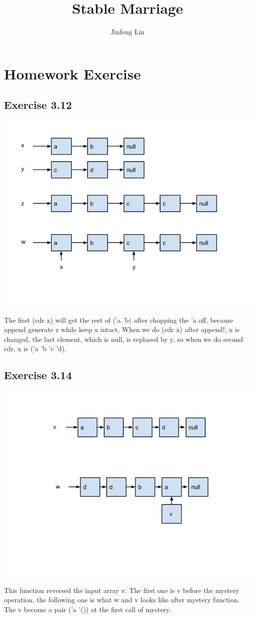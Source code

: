 \documentclass{article}
\begin{document}
\title{Stable Marriage}
\author{Jinfeng Lin}
\maketitle
\clearpage
\section{Homework Exercise}
\subsection{Exercise 3.12}
\includegraphics[width=\textwidth]{./figure}
\indent \par The first (cdr x) will get the rest of ('a 'b) after chopping the 'a off, because append generate z while keep x intact. When we do (cdr x) after append!, x is changed, the last element, which is null, is replaced by y, so when we do second cdr, x is ('a 'b 'c 'd).
\subsection{Exercise 3.14}
\includegraphics[width=\textwidth]{./figure2}
\indent \par This function reversed the input array v. The first one is v before the mystery operation, the following one is what w and v looks like after mystery function. The v become a pair ('a '()) at the first call of mystery.
\end{document}
